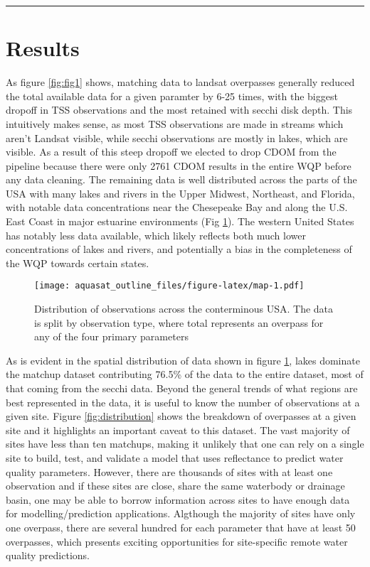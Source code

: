 \documentclass[]{article}
\begin{document}
\begin{center}\rule{0.5\linewidth}{\linethickness}\end{center}

\section{Results}\label{results}

As figure \ref{fig:fig1} shows, matching data to landsat overpasses
generally reduced the total available data for a given paramter by 6-25
times, with the biggest dropoff in TSS observations and the most
retained with secchi disk depth. This intuitively makes sense, as most
TSS observations are made in streams which aren't Landsat visible, while
secchi observations are mostly in lakes, which are visible. As a result
of this steep dropoff we elected to drop CDOM from the pipeline because
there were only 2761 CDOM results in the entire WQP before any data
cleaning. The remaining data is well distributed across the parts of the
USA with many lakes and rivers in the Upper Midwest, Northeast, and
Florida, with notable data concentrations near the Chesepeake Bay and
along the U.S. East Coast in major estuarine environments (Fig
\ref{fig:map}). The western United States has notably less data
available, which likely reflects both much lower concentrations of lakes
and rivers, and potentially a bias in the completeness of the WQP
towards certain states.

\begin{figure}
\centering
\texttt{[image: aquasat\_outline\_files/figure-latex/map-1.pdf]}
\caption{\label{fig:map} Distribution of observations across the
conterminous USA. The data is split by observation type, where total
represents an overpass for any of the four primary parameters}
\end{figure}

As is evident in the spatial distribution of data shown in figure
\ref{fig:map}, lakes dominate the matchup dataset contributing 76.5\% of
the data to the entire dataset, most of that coming from the secchi
data. Beyond the general trends of what regions are best represented in
the data, it is useful to know the number of observations at a given
site. Figure \ref{fig:distribution} shows the breakdown of overpasses at
a given site and it highlights an important caveat to this dataset. The
vast majority of sites have less than ten matchups, making it unlikely
that one can rely on a single site to build, test, and validate a model
that uses reflectance to predict water quality parameters. However,
there are thousands of sites with at least one observation and if these
sites are close, share the same waterbody or drainage basin, one may be
able to borrow information across sites to have enough data for
modelling/prediction applications. Algthough the majority of sites have
only one overpass, there are several hundred for each parameter that
have at least 50 overpasses, which presents exciting opportunities for
site-specific remote water quality predictions.
\end{document}
